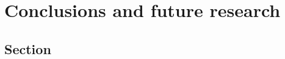 \chapter{Conclusions and future research}
\label{chap:conclusions}



\section{Section}
\label{sec:fifth-section}

\newpage